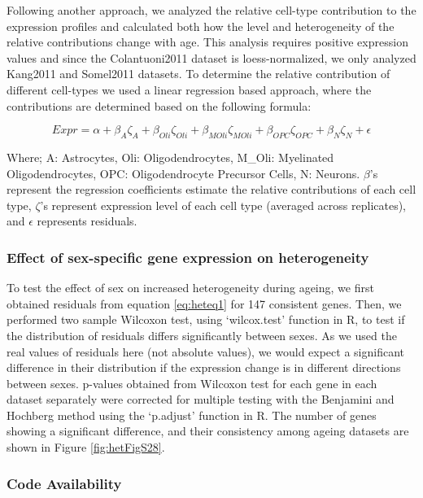 \documentclass[12pt,twoside]{unicam}
\begin{document}
Following another approach, we analyzed the relative cell-type contribution to the expression profiles and calculated both how the level and heterogeneity of the relative contributions change with age. This analysis requires positive expression values and since the Colantuoni2011 dataset is loess-normalized, we only analyzed Kang2011 and Somel2011 datasets. To determine the relative contribution of different cell-types we used a linear regression based approach, where the contributions are determined based on the following formula:

\begin{equation}
    Expr = \alpha + \beta_{A}\zeta_{A} + \beta_{Oli}\zeta_{Oli} + \beta_{MOli}\zeta_{MOli} + \beta_{OPC}\zeta_{OPC} + \beta_{N}\zeta_{N} + \epsilon
  \label{eq:heteq2}
\end{equation}

Where; A: Astrocytes, Oli: Oligodendrocytes, M\_Oli: Myelinated Oligodendrocytes, OPC: Oligodendrocyte Precursor Cells, N: Neurons. \(\beta\)'s represent the regression coefficients estimate the relative contributions of each cell type, \(\zeta\)'s represent expression level of each cell type (averaged across replicates), and \(\epsilon\) represents residuals.

\hypertarget{effect-of-sex-specific-gene-expression-on-heterogeneity}{%
\subsubsection{Effect of sex-specific gene expression on heterogeneity}\label{effect-of-sex-specific-gene-expression-on-heterogeneity}}

To test the effect of sex on increased heterogeneity during ageing, we first obtained residuals from equation \eqref{eq:heteq1} for 147 consistent genes. Then, we performed two sample Wilcoxon test, using `wilcox.test' function in R, to test if the distribution of residuals differs significantly between sexes. As we used the real values of residuals here (not absolute values), we would expect a significant difference in their distribution if the expression change is in different directions between sexes. p-values obtained from Wilcoxon test for each gene in each dataset separately were corrected for multiple testing with the Benjamini and Hochberg method using the `p.adjust' function in R. The number of genes showing a significant difference, and their consistency among ageing datasets are shown in Figure \ref{fig:hetFigS28}.

\hypertarget{code-availability}{%
\subsubsection{Code Availability}\label{code-availability}}
\end{document}
